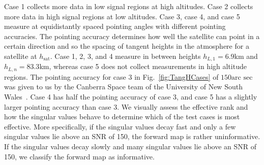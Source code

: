 Case 1 collects more data in low signal regions at high altitudes.
Case 2 collects more data in high signal regions at low altitudes.
Case 3, case 4, and case 5 measure at equidistantly spaced pointing angles with different pointing accuracies.
The pointing accuracy determines how well the satellite can point in a certain direction and so the spacing of tangent heights in the atmosphere for a satellite at $h_{\text{sat}}$.
Case 1, 2, 3, and 4 measure in between heights $h_{L,1} = 6.9$km and $h_{L,n} = 83.3$km, whereas case 5 does not collect measurements in high altitude regions.
The pointing accuracy for case 3 in Fig.~\ref{fig:TangHCases} of $150\text{arc sec}$ was given to us by the Canberra Space team of the University of New South Wales~\cite{CubeSatInternal}.
Case 4 has half the pointing accuracy of case 3, and case 5 has a slightly larger pointing accuracy than case 3.
We visually assess the effective rank and how the singular values behave to determine which of the test cases is most effective.
More specifically, if the singular values decay fast and only a few singular values lie above an SNR of 150, the forward map is rather uninformative.
If the singular values decay slowly and many singular values lie above an SNR of 150, we classify the forward map as informative.


